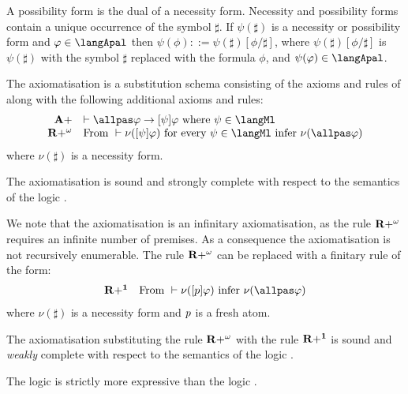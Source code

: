A possibility form is the dual of a necessity form.
Necessity and possibility forms contain a unique occurrence of the symbol $\sharp$.
If $\psi(\sharp)$ is a necessity or possibility form and $\phi \in \langApal$ then $\psi(\phi) ::= \psi(\sharp)[\phi/\sharp]$, where $\psi(\sharp)[\phi/\sharp]$ is $\psi(\sharp)$ with the symbol $\sharp$ replaced with the formula $\phi$, and $\psi(\phi) \in \langApal$.

\begin{definition}
The axiomatisation \axiomApalS{} is a substitution schema consisting of the axioms and rules of \axiomPalS{} along with the following additional axioms and rules:
$$
\begin{array}{rl}
    {\bf A+} & \proves \allpas \phi \implies \announceA{\psi} \phi \text{ where } \psi  \in \langMl\\
    {\bf R+^\omega} & \text{From } \proves \nu(\announceA{\psi} \phi) \text{ for every } \psi \in \langMl \text{ infer } \nu(\allpas \phi)
\end{array}
$$
where $\nu(\sharp)$ is a necessity form.
\end{definition}

\begin{proposition}
The axiomatisation \axiomApalS{} is sound and strongly complete with respect to the semantics of the logic \logicApalS{}.
\end{proposition}

We note that the axiomatisation \axiomApalS{} is an infinitary axiomatisation, as the rule ${\bf R+^\omega}$ requires an infinite number of premises.
As a consequence the axiomatisation is not recursively enumerable.
The rule ${\bf R+^\omega}$ can be replaced with a finitary rule of the form:
$$
\begin{array}{rl}
    {\bf R+^1} & \text{From } \proves \nu(\announceA{\atomP} \phi) \text{ infer } \nu(\allpas \phi)
\end{array}
$$
where $\nu(\sharp)$ is a necessity form and $p$ is a fresh atom.

\begin{proposition}
The axiomatisation \axiomApalS{} substituting the rule ${\bf R+^\omega}$ with the rule ${\bf R+^1}$ is sound and {\em weakly} complete with respect to the semantics of the logic \logicApalS{}.
\end{proposition}

\begin{proposition}
The logic \logicApalS{} is strictly more expressive than the logic \logicPalS{}.
\end{proposition}

